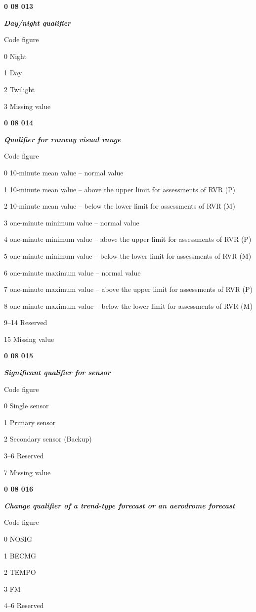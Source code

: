 \textbf{0 08 013}

\emph{\textbf{Day/night qualifier}}

Code figure

0 Night

1 Day

2 Twilight

3 Missing value

\textbf{0 08 014}

\emph{\textbf{Qualifier for runway visual range}}

Code figure

0 10-minute mean value -- normal value

1 10-minute mean value -- above the upper limit for assessments of RVR (P)

2 10-minute mean value -- below the lower limit for assessments of RVR (M)

3 one-minute minimum value -- normal value

4 one-minute minimum value -- above the upper limit for assessments of RVR (P)

5 one-minute minimum value -- below the lower limit for assessments of RVR (M)

6 one-minute maximum value -- normal value

7 one-minute maximum value -- above the upper limit for assessments of RVR (P)

8 one-minute maximum value -- below the lower limit for assessments of RVR (M)

9--14 Reserved

15 Missing value

\textbf{0 08 015}

\emph{\textbf{Significant qualifier for sensor}}

Code figure

0 Single sensor

1 Primary sensor

2 Secondary sensor (Backup)

3--6 Reserved

7 Missing value

\textbf{0 08 016}

\emph{\textbf{Change qualifier of a trend-type forecast or an aerodrome forecast}}

Code figure

0 NOSIG

1 BECMG

2 TEMPO

3 FM

4--6 Reserved


